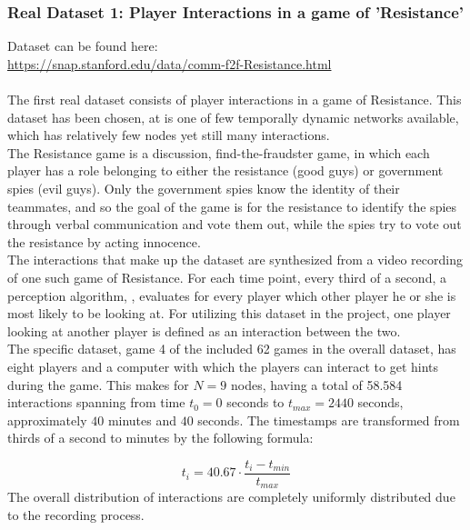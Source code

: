 \subsubsection{Real Dataset 1: Player Interactions in a game of 'Resistance'}
\label{sec:Data:RealData:RealDataset1}
Dataset can be found here:
\\
\href{https://snap.stanford.edu/data/comm-f2f-Resistance.html}{https://snap.stanford.edu/data/comm-f2f-Resistance.html}
\\\\
The first real dataset consists of player interactions in a game of Resistance. 
This dataset has been chosen, at is one of few temporally dynamic networks available, which has relatively few nodes yet still many interactions.
\\
The Resistance game is a discussion, find-the-fraudster game, in which each player has a role belonging to either the resistance (good guys) or government spies (evil guys).
Only the government spies know the identity of their teammates, and so the goal of the game is for the resistance to identify the spies through verbal communication and vote them out, while the spies try to vote out the resistance by acting innocence. 
\\
The interactions that make up the dataset are synthesized from a video recording of one such game of Resistance.
For each time point, every third of a second, a perception algorithm, \cite{BaiPredictingVideos} \cite{Kumar2019PredictingNetworks}, evaluates for every player which other player he or she is most likely to be looking at.
For utilizing this dataset in the project, one player looking at another player is defined as an interaction between the two.
\\
The specific dataset, game 4 of the included 62 games in the overall dataset, has eight players and a computer with which the players can interact to get hints during the game.
This makes for $N=9$ nodes, having a total of 58.584 interactions spanning from time $t_{0} = 0$ seconds to $t_{max} = 2440$ seconds, approximately $40$ minutes and $40$ seconds.
The timestamps are transformed from thirds of a second to minutes by the following formula:

\begin{equation}
    t_i = 40.67 \cdot \frac{t_i - t_{min}}{t_{max}}
\end{equation}
The overall distribution of interactions are completely uniformly distributed due to the recording process.



